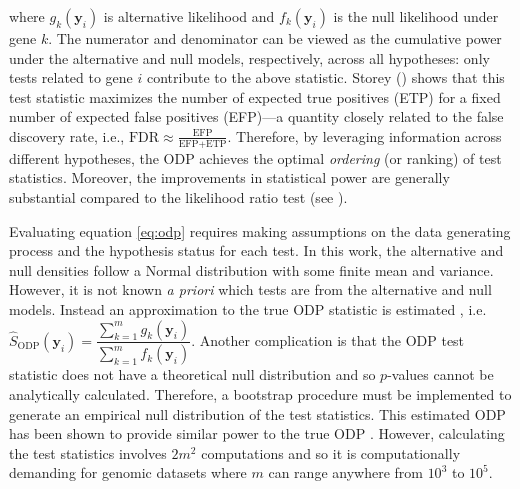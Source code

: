 \documentclass[11pt]{article}
\begin{document}
\noindent where $g_{k}(\mathbf{y}_{i})$ is alternative likelihood and $f_{k}(\mathbf{y}_{i})$ is the null likelihood under gene $k$. The numerator and denominator can be viewed as the cumulative power under the alternative and null models, respectively, across all hypotheses: only tests related to gene $i$ contribute to the above statistic. Storey (\citeyear{Storey_2007_odp}) shows that this test statistic maximizes the number of expected true positives (ETP) for a fixed number of expected false positives (EFP)---a quantity closely related to the false discovery rate, i.e., $\text{FDR} \approx \frac{\text{EFP}}{\text{EFP} + \text{ETP}}$. Therefore, by leveraging information across different hypotheses, the ODP achieves the optimal \textit{ordering} (or ranking) of test statistics. Moreover, the improvements in statistical power are generally substantial compared to the likelihood ratio test (see \citep{Storey_2007_odp}).

Evaluating equation \eqref{eq:odp} requires making assumptions on the data generating process and the hypothesis status for each test. In this work, the alternative and null densities follow a Normal distribution with some finite mean and variance. However, it is not known \textit{a priori} which tests are from the alternative and null models. Instead an approximation to the true ODP statistic is estimated \citep{Storey_2006}, i.e. $\hat{S}_{\text{ODP}}(\mathbf{y}_{i}) = \dfrac{\sum_{k=1}^{m} g_{k}(\mathbf{y}_{i})}{\sum_{k=1}^{m} f_{k}(\mathbf{y}_{i})}$. Another complication is that the ODP test statistic does not have a theoretical null distribution and so $p$-values cannot be analytically calculated. Therefore, a bootstrap procedure must be implemented to generate an empirical null distribution of the test statistics. This estimated ODP has been shown to provide similar power to the true ODP \citep{Storey_2006}. However, calculating the test statistics involves $2m^2$ computations and so it is computationally demanding for genomic datasets where $m$ can range anywhere from $10^{3}$ to $10^{5}$.
\end{document}
